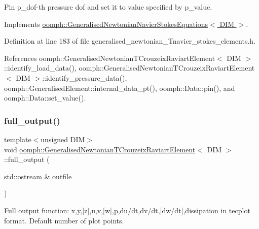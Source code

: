 Pin p\+\_\+dof-\/th pressure dof and set it to value specified by p\+\_\+value. 



Implements \hyperlink{classoomph_1_1GeneralisedNewtonianNavierStokesEquations_a1a39938f37a0a61229e273ea541d5437}{oomph\+::\+Generalised\+Newtonian\+Navier\+Stokes\+Equations$<$ D\+I\+M $>$}.



Definition at line 183 of file generalised\+\_\+newtonian\+\_\+\+Tnavier\+\_\+stokes\+\_\+elements.\+h.



References oomph\+::\+Generalised\+Newtonian\+T\+Crouzeix\+Raviart\+Element$<$ D\+I\+M $>$\+::identify\+\_\+load\+\_\+data(), oomph\+::\+Generalised\+Newtonian\+T\+Crouzeix\+Raviart\+Element$<$ D\+I\+M $>$\+::identify\+\_\+pressure\+\_\+data(), oomph\+::\+Generalised\+Element\+::internal\+\_\+data\+\_\+pt(), oomph\+::\+Data\+::pin(), and oomph\+::\+Data\+::set\+\_\+value().

\mbox{\label{classoomph_1_1GeneralisedNewtonianTCrouzeixRaviartElement_abaec416cf3cfb7886e69df9e16aa18ff}} 
\subsubsection{\texorpdfstring{full\+\_\+output()}{full\_output()}\hspace{0.1cm}{\footnotesize\ttfamily [1/2]}}
{\footnotesize\ttfamily template$<$unsigned D\+IM$>$ \\
void \hyperlink{classoomph_1_1GeneralisedNewtonianTCrouzeixRaviartElement}{oomph\+::\+Generalised\+Newtonian\+T\+Crouzeix\+Raviart\+Element}$<$ D\+IM $>$\+::full\+\_\+output (\begin{DoxyParamCaption}\item[{std\+::ostream \&}]{outfile }\end{DoxyParamCaption})\hspace{0.3cm}{\ttfamily [inline]}}



Full output function\+: x,y,\mbox{[}z\mbox{]},u,v,\mbox{[}w\mbox{]},p,du/dt,dv/dt,\mbox{[}dw/dt\mbox{]},dissipation in tecplot format. Default number of plot points. 



